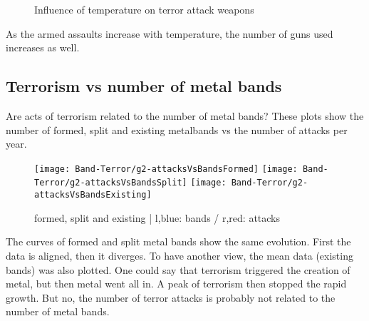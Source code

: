 \begin{figure}[!ht]
\centering
    \qquad
    \qquad
    \qquad
    \qquad
    \qquad
\caption{Influence of temperature on terror attack weapons}
\label{fig:example subfigure}
\end{figure}

As the armed assaults increase with temperature, the number of guns used increases as well.





\subsection{Terrorism vs number of metal bands}
Are acts of terrorism related to the number of metal bands? These plots show the number of formed, split and existing metalbands vs the number of attacks per year.
\begin{figure}[hbt!]
	\texttt{[image: Band-Terror/g2-attacksVsBandsFormed]}
	\centering
	\texttt{[image: Band-Terror/g2-attacksVsBandsSplit]}
	\texttt{[image: Band-Terror/g2-attacksVsBandsExisting]}
	\caption{formed, split and existing | l,blue: bands / r,red: attacks}
\end{figure}
The curves of formed and split metal bands show the same evolution. First the data is aligned, then it diverges. To have another view, the mean data (existing bands) was also plotted. One could say that terrorism triggered the creation of metal, but then metal went all in. A peak of terrorism then stopped the rapid growth. But no, the number of terror attacks is probably not related to the number of metal bands.


